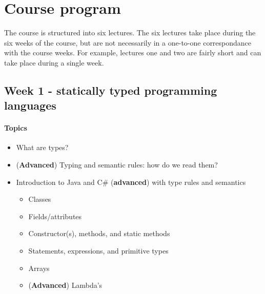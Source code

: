 \section{Course program}
	The course is structured into six lectures. The six lectures take place during the six weeks of the course, but are not necessarily in a one-to-one correspondance with the course weeks. For example, lectures one and two are fairly short and can take place during a single week.

		\subsection{Week 1 - statically typed programming languages}
		\paragraph*{Topics}
		\begin{itemize}
			\item What are types?
			\item (\textbf{Advanced}) Typing and semantic rules: how do we read them?
			\item Introduction to Java and C\# (\textbf{advanced}) with type rules and semantics
			\begin{itemize}
				\item Classes
				\item Fields/attributes
				\item Constructor(s), methods, and static methods
				\item Statements, expressions, and primitive types
				\item Arrays
				\item (\textbf{Advanced}) Lambda's
			\end{itemize}
		\end{itemize}
		
